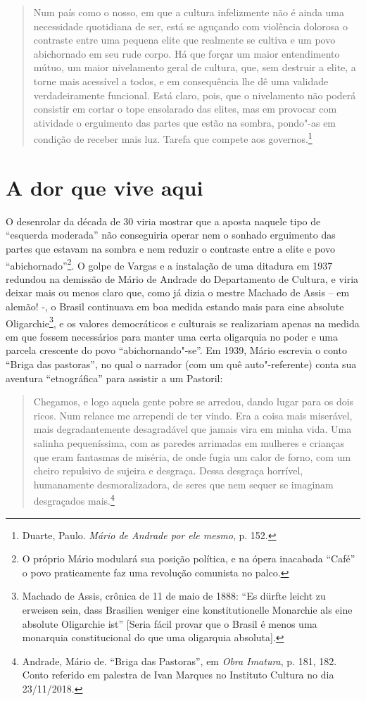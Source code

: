 \begin{quote}
Num país como o nosso, em que a cultura infelizmente não é ainda uma
necessidade quotidiana de ser, está se aguçando com violência dolorosa o
contraste entre uma pequena elite que realmente se cultiva e um povo
abichornado em seu rude corpo. Há que forçar um maior entendimento
mútuo, um maior nivelamento geral de cultura, que, sem destruir a elite,
a torne mais acessível a todos, e em consequência lhe dê uma validade
verdadeiramente funcional. Está claro, pois, que o nivelamento não
poderá consistir em cortar o tope ensolarado das elites, mas em provocar
com atividade o erguimento das partes que estão na sombra, pondo"-as em
condição de receber mais luz. Tarefa que compete aos governos.\footnote{Duarte,
  Paulo. \emph{Mário de Andrade por ele mesmo}, p. 152.}
\end{quote}

\section{A dor que vive aqui}

O desenrolar da década de 30 viria mostrar que a aposta naquele tipo de
``esquerda moderada'' não conseguiria operar nem o sonhado erguimento
das partes que estavam na sombra e nem reduzir o contraste entre a elite
e povo ``abichornado''\footnote{O próprio Mário modulará sua posição
  política, e na ópera inacabada ``Café'' o povo praticamente faz uma
  revolução comunista no palco.}. O golpe de Vargas e a instalação de
uma ditadura em 1937 redundou na demissão de Mário de Andrade do
Departamento de Cultura, e viria deixar mais ou menos claro que, como já
dizia o mestre Machado de Assis -- em alemão! -, o Brasil continuava em
boa medida estando mais para eine absolute Oligarchie\footnote{Machado
  de Assis, crônica de 11 de maio de 1888: ``Es dürfte leicht zu
  erweisen sein, dass Brasilien weniger eine konstitutionelle Monarchie
  als eine absolute Oligarchie ist'' {[}Seria fácil provar que o Brasil
  é menos uma monarquia constitucional do que uma oligarquia
  absoluta{]}.}, e os valores democráticos e culturais se realizariam
apenas na medida em que fossem necessários para manter uma certa
oligarquia no poder e uma parcela crescente do povo ``abichornando"-se''.
Em 1939, Mário escrevia o conto ``Briga das pastoras'', no qual o
narrador (com um quê auto"-referente) conta sua aventura ``etnográfica''
para assistir a um Pastoril:

\begin{quote}
Chegamos, e logo aquela gente pobre se arredou, dando lugar para os dois
ricos. Num relance me arrependi de ter vindo. Era a coisa mais
miserável, mais degradantemente desagradável que jamais vira em minha
vida. Uma salinha pequeníssima, com as paredes arrimadas em mulheres e
crianças que eram fantasmas de miséria, de onde fugia um calor de forno,
com um cheiro repulsivo de sujeira e desgraça. Dessa desgraça horrível,
humanamente desmoralizadora, de seres que nem sequer se imaginam
desgraçados mais.\footnote{Andrade, Mário de. ``Briga das Pastoras'', em
  \emph{Obra Imatura}, p. 181, 182. Conto referido em palestra de Ivan
  Marques no Instituto  Cultura no dia 23/11/2018.}
\end{quote}

